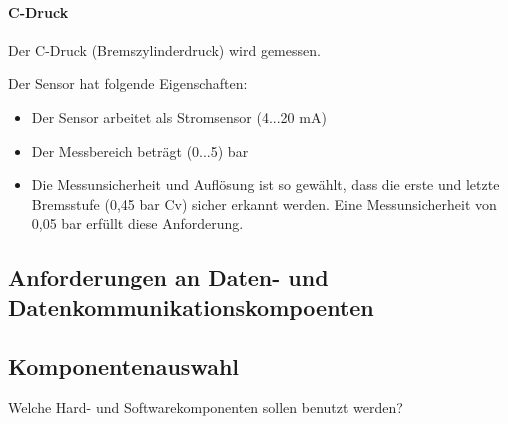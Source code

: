 \paragraph{C-Druck}
\label{sec:CDruck}
\begin{feat}
Der C-Druck (Bremszylinderdruck) wird gemessen.
\end{feat}
\begin{feat}
Der Sensor hat folgende Eigenschaften:
\begin{itemize}
    \item Der Sensor arbeitet als Stromsensor (4...20 mA)
    \item Der Messbereich beträgt (0...5) bar
    \item Die Messunsicherheit und Auflösung ist so gewählt, dass die erste und letzte Bremsstufe (0,45 bar Cv) sicher erkannt werden. Eine Messunsicherheit von 0,05 bar erfüllt diese Anforderung.
\end{itemize}
\end{feat}





\subsection{Anforderungen an Daten- und Datenkommunikationskompoenten}

\subsection{Komponentenauswahl}
Welche Hard- und Softwarekomponenten sollen benutzt werden?